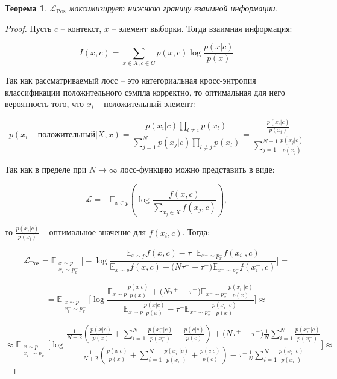 \documentclass[a4paper, 14pt]{article}
\newtheorem{theorem}{Теорема}
\begin{document}
\begin{theorem}
\label{thm:asympt}
$\mathcal{L}_{\text{Pos}}$ максимизирует нижнюю границу взаимной информации.
\end{theorem}

\begin{proof}
Пусть $c$ -- контекст, $x$ -- элемент выборки. Тогда взаимная информация:

\[I(x, c) = \sum\limits_{x \in X, c \in C}p(x, c)\log \frac{p(x|c)}{p(x)}\]

Так как рассматриваемый лосс -- это категориальная кросс-энтропия классификации положительного сэмпла корректно, то оптимальная для него вероятность того, что $x_i$ -- положительный элемент:

\[p(x_i \text{ -- положительный} | X, x) = \frac{p(x_i|c)\prod_{l \neq i}p(x_l)}{\sum_{j=1}^Np(x_j|c)\prod_{l \neq j}p(x_l)} = \frac{\frac{p(x_i|c)}{p(x_i)}}{\sum_{j=1}^{N+1}\frac{p(x_j|c)}{p(x_j)}}\]

Так как в пределе при $N \to \infty$ лосс-функцию можно представить в виде:

\[\mathcal{L} = - \mathbb{E}_{x \in p}\left(\log\frac{f(x, c)}{\sum_{x_j \in X}f(x_j, c)}\right),\]

\noindent то $\frac{p(x_i|c)}{p(x_i)}$ -- оптимальное значение для $f(x_i, c)$. Тогда:

\[\mathcal{L}_{\text{Pos}} = \mathbb{E}_{\substack{x \sim p \\ x_i \sim p_x^-}} \bigg[ - \log \frac{\mathbb{E}_{x \sim p}f(x, c) - \tau^- \mathbb{E}_{x^- \sim p_x^-} f(x_i^-, c)}{\mathbb{E}_{x \sim p} f(x, c) + \big(N \tau^+ - \tau^-\big) \mathbb{E}_{x^- \sim p_x^-} f(x_i^-, c)}\bigg] =\]

\[= \mathbb{E}_{\substack{x \sim p \\ x_i^- \sim p_x^-}} \bigg[\log \frac{\mathbb{E}_{x \sim p}\frac{p(x|c)}{p(x)} + \big(N \tau^+ - \tau^-\big) \mathbb{E}_{x^- \sim p_x^-}\frac{p(x_i^-|c)}{p(x)}}{\mathbb{E}_{x \sim p}\frac{p(x|c)}{p(x)} - \tau^- \mathbb{E}_{x^- \sim p_x^-}\frac{p(x_i^-|c)}{p(x)}}\bigg] \approx\]

\[\approx \mathbb{E}_{\substack{x \sim p \\ x_i^- \sim p_x^-}} \bigg[\log \frac{\frac{1}{N + 2}\left(\frac{p(x|c)}{p(x)} + \sum\limits_{i=1}^N\frac{p(x_i^-|c)}{p(x_i^-)} + \frac{p(c|c)}{p(c)}\right) + \big(N \tau^+ - \tau^-\big)\frac{1}{N}\sum\limits_{i=1}^N\frac{p(x_i^-|c)}{p(x_i^-)}}{\frac{1}{N + 2}\left(\frac{p(x|c)}{p(x)} + \sum\limits_{i=1}^N\frac{p(x_i^-|c)}{p(x_i^-)} + \frac{p(c|c)}{p(c)}\right) - \tau^-\frac{1}{N}\sum\limits_{i=1}^N\frac{p(x_i^-|c)}{p(x_i^-)}}\bigg] \approx\]


\end{proof}
\end{document}
